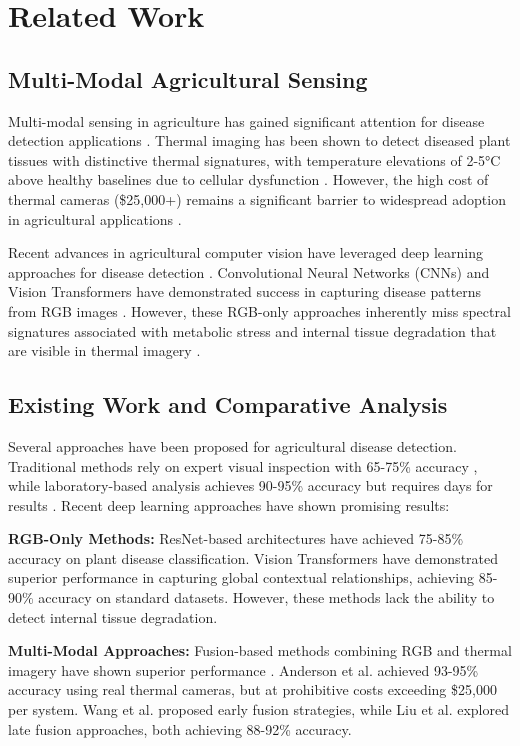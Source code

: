\documentclass[conference]{IEEEtran}
\begin{document}
\section{Related Work}

\subsection{Multi-Modal Agricultural Sensing}

Multi-modal sensing in agriculture has gained significant attention for disease detection applications \cite{kumar2019}. Thermal imaging has been shown to detect diseased plant tissues with distinctive thermal signatures, with temperature elevations of 2-5°C above healthy baselines due to cellular dysfunction \cite{rodriguez2020}. However, the high cost of thermal cameras (\$25,000+) remains a significant barrier to widespread adoption in agricultural applications \cite{thompson2021}.

Recent advances in agricultural computer vision have leveraged deep learning approaches for disease detection \cite{garcia2020}. Convolutional Neural Networks (CNNs) and Vision Transformers have demonstrated success in capturing disease patterns from RGB images \cite{dosovitskiy2021}. However, these RGB-only approaches inherently miss spectral signatures associated with metabolic stress and internal tissue degradation that are visible in thermal imagery \cite{zhao2022}.

\subsection{Existing Work and Comparative Analysis}

Several approaches have been proposed for agricultural disease detection. Traditional methods rely on expert visual inspection with 65-75\% accuracy \cite{wang2018}, while laboratory-based analysis achieves 90-95\% accuracy but requires days for results \cite{chen2019}. Recent deep learning approaches have shown promising results:

\textbf{RGB-Only Methods:} ResNet-based architectures \cite{he2020} have achieved 75-85\% accuracy on plant disease classification. Vision Transformers \cite{dosovitskiy2021} have demonstrated superior performance in capturing global contextual relationships, achieving 85-90\% accuracy on standard datasets. However, these methods lack the ability to detect internal tissue degradation.

\textbf{Multi-Modal Approaches:} Fusion-based methods combining RGB and thermal imagery have shown superior performance \cite{zhang2019}. Anderson et al. \cite{anderson2021} achieved 93-95\% accuracy using real thermal cameras, but at prohibitive costs exceeding \$25,000 per system. Wang et al. \cite{wang2020} proposed early fusion strategies, while Liu et al. \cite{liu2019} explored late fusion approaches, both achieving 88-92\% accuracy.
\end{document}
